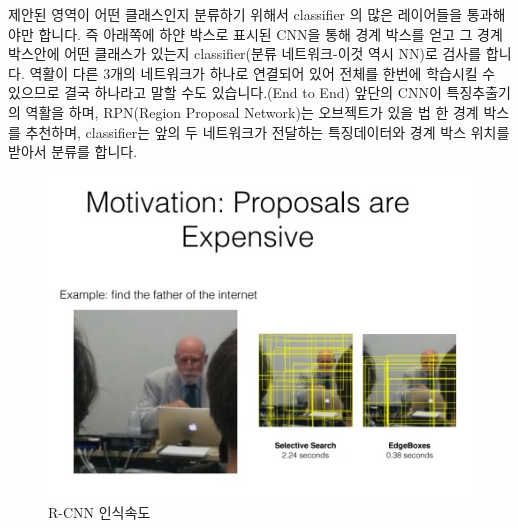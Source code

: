 \documentclass{article}
\begin{document}
제안된 영역이 어떤 클래스인지 분류하기 위해서 classifier 의 많은 레이어들을 통과해야만 합니다.
즉 아래쪽에 하얀 박스로 표시된 CNN을 통해 경계 박스를 얻고 그 경계박스안에 어떤 클래스가 있는지
classifier(분류 네트워크-이것 역시 NN)로 검사를 합니다.
 역활이 다른 3개의 네트워크가 하나로 연결되어 있어 전체를 한번에 학습시킬 수 있으므로 결국 하나라고 말할 수도 있습니다.(End to End)
앞단의 CNN이 특징추출기의 역활을 하며, RPN(Region Proposal Network)는 오브젝트가 있을 법 한 경계 박스를 추천하며,
classifier는 앞의 두 네트워크가 전달하는 특징데이터와 경계 박스 위치를 받아서 분류를 합니다.


\begin{figure}[h!]
\centering
\includegraphics[scale=3.0]{enhanceyolo1.jpg}
\caption{R-CNN 인식속도}
\label{fig:detect}
\end{figure}
\end{document}
